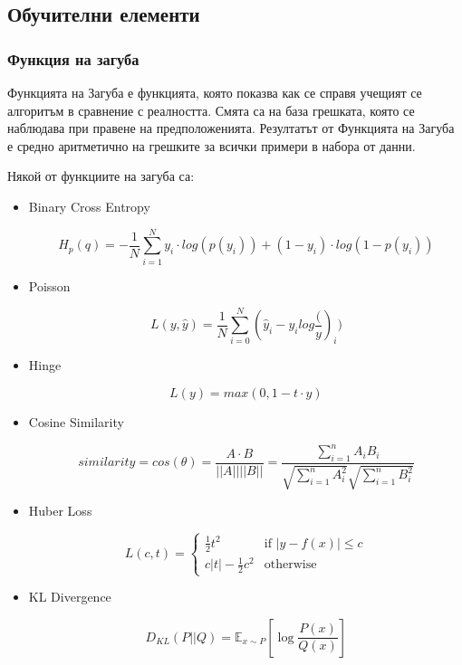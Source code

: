\documentclass{article}
\begin{document}
\subsection{Обучителни елементи}

\subsubsection{Функция на загуба}

Функцията на Загуба е функцията, която показва как се справя учещият се алгоритъм в сравнение с реалността. Смята са на
база грешката, която се наблюдава при правене на предположенията. Резултатът от Функцията на Загуба е средно
аритметично на грешките за всички примери в набора от данни. \cite{deep-learning-practitioner}

Някой от функциите на загуба са:

\begin{itemize}
  \item Binary Cross Entropy

  \begin{equation}
    H_p(q)=-\frac{1}{N} \sum_{i=1}^{N} y_i \cdot log(p(y_i)) + (1 - y_i) \cdot log(1 - p(y_i))
  \end{equation}

  \item Poisson

  \begin{equation}
    L(y, \hat{y}) = \frac{1}{N} \sum_{i = 0}^{N} (\hat{y}_i - y_i log \frac(y)_i)
  \end{equation}

  \item Hinge

  \begin{equation}
    L(y) = max(0, 1 - t \cdot y)
  \end{equation}

  \item Cosine Similarity

  \begin{equation}
    similarity = cos(\theta) = \frac{A \cdot B}{||A|| ||B||} = \frac{\sum_{i=1}^{n} A_i B_i}{\sqrt{\sum_ {i = 1}^{n} A_i^2} \sqrt{\sum_ {i = 1}^{n} B_i^2}}
  \end{equation}

  \item Huber Loss

  \begin{equation}
    L(c, t) =
    \begin{cases}
      \frac{1}{2} t^2 & \text{if } |y - f(x)| \leq c \\
      c |t| - \frac{1}{2} c^2 & \text{otherwise}
    \end{cases}
  \end{equation}

  \item KL Divergence

  \begin{equation}
    D_{KL}(P||Q) = \mathbb{E}_{x \sim P}[\log\frac{P(x)}{Q(x)}]
  \end{equation}

\end{itemize}
\end{document}
